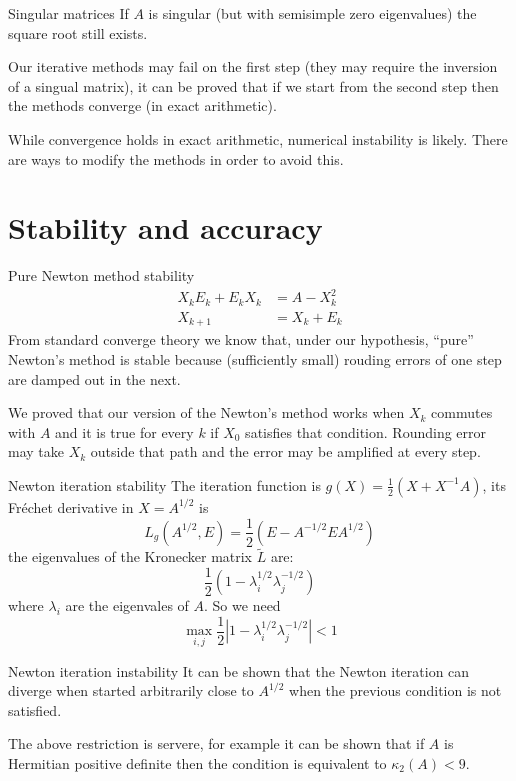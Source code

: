 \documentclass{beamer}
\theoremstyle{plain}
\theoremstyle{definition}
\theoremstyle{remark}
\newcommand{\pa}[1]{\left(#1\right)}
\newcommand{\abs}[1]{\left|#1\right|}
\begin{document}
\begin{frame}{Singular matrices}
  If $A$ is singular (but with semisimple zero eigenvalues) the square
  root still exists.

  Our iterative methods may fail on the first step (they may require
  the inversion of a singual matrix), it can be proved that if we
  start from the second step then the methods converge (in exact
  arithmetic).  \vfill
  
  While convergence holds in exact arithmetic, numerical instability
  is likely. There are ways to modify the methods in order to avoid
  this.
\end{frame}

\section{Stability and accuracy}

\begin{frame}{Pure Newton method stability}
  \begin{align*}
    X_k E_k + E_k X_k &= A - X_k ^2 \\
    X_{k+1} &= X_k + E_k
  \end{align*}
  From standard converge theory we know that, under our hypothesis,
  ``pure'' Newton's method is stable because (sufficiently small)
  rouding errors of one step are damped out in the next. \vfill

  We proved that our version of the Newton's method works when $X_k$
  commutes with $A$ and it is true for every $k$ if $X_0$ satisfies
  that condition. Rounding error may take $X_k$ outside that path and
  the error may be amplified at every step.
\end{frame}

\begin{frame}{Newton iteration stability}
  The iteration function is $g(X) = \frac{1}{2}\pa{X+ X^{-1}A}$, its
  Fr\'echet derivative in $X=A^{1/2}$ is
  \[ L_g\pa{A^{1/2},E} = \frac{1}{2}\pa{E-A^{-1/2}EA^{1/2}} \]
  the eigenvalues of the Kronecker matrix $\tilde L$ are:
  \[ \frac{1}{2}\pa{1-\lambda _i ^{1/2} \lambda _j^{-1/2}} \]
  where $\lambda _i$ are the eigenvales of $A$. So we need
  \[ \max _{i,j} \frac{1}{2} \abs{ 1- \lambda _i^{1/2} \lambda
      _j^{-1/2}} <1 \]
\end{frame}

\begin{frame}{Newton iteration instability}
  It can be shown that the Newton iteration can diverge when started
  arbitrarily close to $A^{1/2}$ when the previous condition is not
  satisfied. \vfill

  The above restriction is servere, for example it can be shown that
  if $A$ is Hermitian positive definite then the condition is
  equivalent to $\kappa _2 (A) <9$.
\end{frame}
\end{document}
